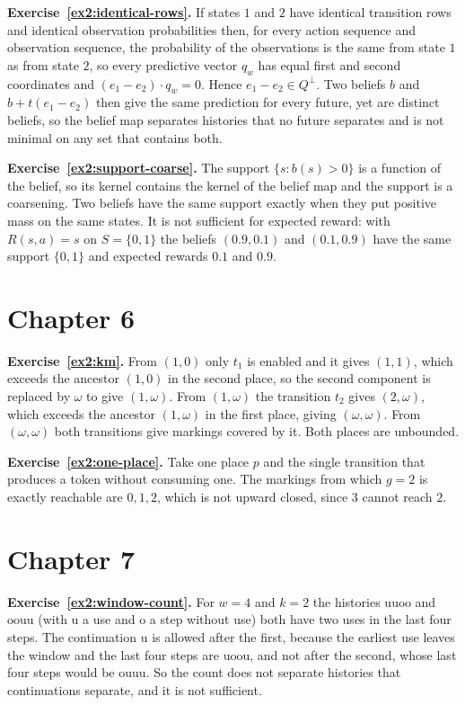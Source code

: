 \textbf{Exercise~\ref{ex2:identical-rows}.} If states $1$ and $2$ have identical transition rows and identical observation probabilities then, for every action sequence and observation sequence, the probability of the observations is the same from state $1$ as from state $2$, so every predictive vector $q_w$ has equal first and second coordinates and $(e_1-e_2)\cdot q_w=0$. Hence $e_1-e_2\in Q^{\perp}$. Two beliefs $b$ and $b+t(e_1-e_2)$ then give the same prediction for every future, yet are distinct beliefs, so the belief map separates histories that no future separates and is not minimal on any set that contains both.

\textbf{Exercise~\ref{ex2:support-coarse}.} The support $\{s:b(s)>0\}$ is a function of the belief, so its kernel contains the kernel of the belief map and the support is a coarsening. Two beliefs have the same support exactly when they put positive mass on the same states. It is not sufficient for expected reward: with $R(s,a)=s$ on $S=\{0,1\}$ the beliefs $(0.9,0.1)$ and $(0.1,0.9)$ have the same support $\{0,1\}$ and expected rewards $0.1$ and $0.9$.

\section*{Chapter 6}

\textbf{Exercise~\ref{ex2:km}.} From $(1,0)$ only $t_1$ is enabled and it gives $(1,1)$, which exceeds the ancestor $(1,0)$ in the second place, so the second component is replaced by $\omega$ to give $(1,\omega)$. From $(1,\omega)$ the transition $t_2$ gives $(2,\omega)$, which exceeds the ancestor $(1,\omega)$ in the first place, giving $(\omega,\omega)$. From $(\omega,\omega)$ both transitions give markings covered by it. Both places are unbounded.

\textbf{Exercise~\ref{ex2:one-place}.} Take one place $p$ and the single transition that produces a token without consuming one. The markings from which $g=2$ is exactly reachable are $0,1,2$, which is not upward closed, since $3$ cannot reach $2$.

\section*{Chapter 7}

\textbf{Exercise~\ref{ex2:window-count}.} For $w=4$ and $k=2$ the histories $\mathrm u\mathrm u\mathrm o\mathrm o$ and $\mathrm o\mathrm o\mathrm u\mathrm u$ (with $\mathrm u$ a use and $\mathrm o$ a step without use) both have two uses in the last four steps. The continuation $\mathrm u$ is allowed after the first, because the earliest use leaves the window and the last four steps are $\mathrm u\mathrm o\mathrm o\mathrm u$, and not after the second, whose last four steps would be $\mathrm o\mathrm u\mathrm u\mathrm u$. So the count does not separate histories that continuations separate, and it is not sufficient.

